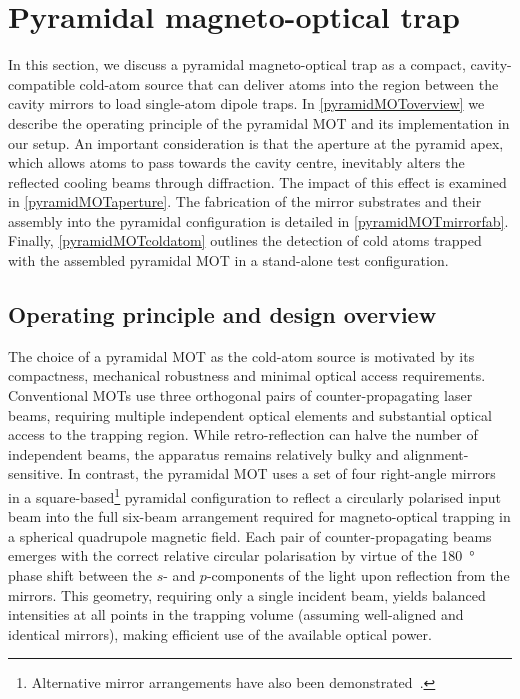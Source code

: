 \documentclass[../Thesis-IJspeert.tex]{subfiles}
\begin{document}
\section{Pyramidal magneto-optical trap}
\label{sec:pyramidal_mot}
In this section, we discuss a pyramidal magneto-optical trap as a compact, cavity-compatible cold-atom source that can deliver atoms into the region between the cavity mirrors to load single-atom dipole traps. In \autoref{pyramidMOToverview} we describe the operating principle of the pyramidal MOT and its implementation in our setup. An important consideration is that the aperture at the pyramid apex, which allows atoms to pass towards the cavity centre, inevitably alters the reflected cooling beams through diffraction. The impact of this effect is examined in \autoref{pyramidMOTaperture}. The fabrication of the mirror substrates and their assembly into the pyramidal configuration is detailed in \autoref{pyramidMOTmirrorfab}. Finally, \autoref{pyramidMOTcoldatom} outlines the detection of cold atoms trapped with the assembled pyramidal MOT in a stand-alone test configuration.

\subsection{Operating principle and design overview}
\label{pyramidMOToverview}
The choice of a pyramidal MOT as the cold-atom source is motivated by its compactness, mechanical robustness and minimal optical access requirements. Conventional MOTs use three orthogonal pairs of counter-propagating laser beams, requiring multiple independent optical elements and substantial optical access to the trapping region. While retro-reflection can halve the number of independent beams, the apparatus remains relatively bulky and alignment-sensitive. In contrast, the pyramidal MOT uses a set of four right-angle mirrors in a square-based\footnote{Alternative mirror arrangements have also been demonstrated~\cite{Vangeleyn2009, Kim1997, Vangeleyn2010}.} pyramidal configuration to reflect a circularly polarised input beam into the full six-beam arrangement required for magneto-optical trapping in a spherical quadrupole magnetic field. Each pair of counter-propagating beams emerges with the correct relative circular polarisation by virtue of the \SI{180}{\degree} phase shift between the $s$- and $p$-components of the light upon reflection from the mirrors. This geometry, requiring only a single incident beam, yields balanced intensities at all points in the trapping volume (assuming well-aligned and identical mirrors), making efficient use of the available optical power.
\end{document}
